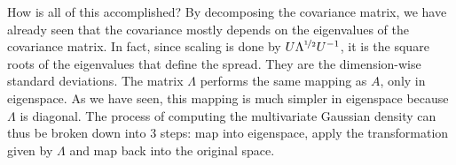 How is all of this accomplished? By decomposing the covariance matrix, we have already seen that the covariance mostly depends on the eigenvalues of the covariance matrix.
In fact, since scaling is done by $ U\Lambda^{\nicefrac{1}{2}} U^{-1} $, it is the square roots of the eigenvalues that define the spread. They are the dimension-wise standard deviations.
The matrix $ \Lambda $ performs the same mapping as $ A $, only in eigenspace. As we have seen, this mapping is much simpler in eigenspace because $ \Lambda $ is
diagonal. The process of computing the multivariate Gaussian density can thus be broken down into 3 steps: map into eigenspace, apply the transformation given by
$ \Lambda $ and map back into the original space. 
